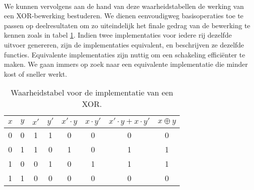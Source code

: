 \paragraph{}
We kunnen vervolgens aan de hand van deze waarheidstabellen de werking van een XOR-bewerking bestuderen. We dienen eenvoudigweg basisoperaties toe te passen op deelresultaten om zo uiteindelijk het finale gedrag van de bewerking te kennen zoals in tabel \ref{tbl:truthTableXOR}. Indien twee implementaties voor iedere rij dezelfde uitvoer genereren, zijn de implementaties equivalent, en beschrijven ze dezelfde functies. Equivalente implementaties zijn nuttig om een schakeling effici\"enter te maken. We gaan immers op zoek naar een equivalente implementatie die minder kost of sneller werkt.
\begin{table}[htb]
\centering
\begin{tabular}{cc|ccccc|c}
$x$&$y$&$x'$&$y'$&$x'\cdot y$&$x\cdot y'$&$x'\cdot y+x\cdot y'$&$x\oplus y$\\\hline
0&0&1&1&0&0&0&0\\
0&1&1&0&1&0&1&1\\
1&0&0&1&0&1&1&1\\
1&1&0&0&0&0&0&0\\
\end{tabular}
\caption{Waarheidstabel voor de implementatie van een XOR.}
\label{tbl:truthTableXOR}
\end{table}
